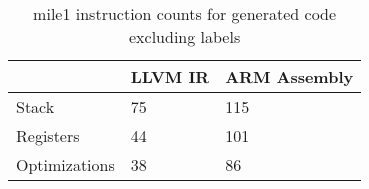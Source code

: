 \begin{table}[h!]
\centering
\begin{tabular}{p{}p{}p{}}
  \hline
 & LLVM IR & ARM Assembly \\ 
  \hline
Stack &  75 & 115 \\ 
  Registers &  44 & 101 \\ 
  Optimizations &  38 &  86 \\ 
   \hline
\end{tabular}
\caption{mile1 instruction counts for generated code excluding labels}
\end{table}
